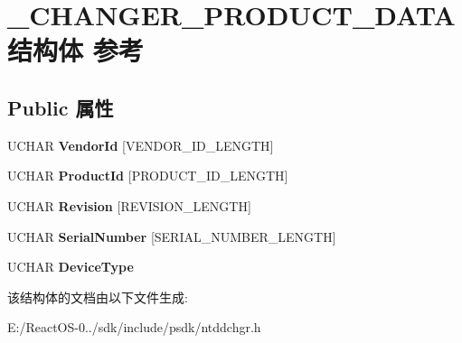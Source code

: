 \hypertarget{struct___c_h_a_n_g_e_r___p_r_o_d_u_c_t___d_a_t_a}{}\section{\+\_\+\+C\+H\+A\+N\+G\+E\+R\+\_\+\+P\+R\+O\+D\+U\+C\+T\+\_\+\+D\+A\+T\+A结构体 参考}
\label{struct___c_h_a_n_g_e_r___p_r_o_d_u_c_t___d_a_t_a}
\subsection*{Public 属性}
\begin{DoxyCompactItemize}
\item 
\mbox{\label{struct___c_h_a_n_g_e_r___p_r_o_d_u_c_t___d_a_t_a_a414f686fd51bea3dd3a80bcc1af3b186}} 
U\+C\+H\+AR {\bfseries Vendor\+Id} \mbox{[}V\+E\+N\+D\+O\+R\+\_\+\+I\+D\+\_\+\+L\+E\+N\+G\+TH\mbox{]}
\item 
\mbox{\label{struct___c_h_a_n_g_e_r___p_r_o_d_u_c_t___d_a_t_a_afbf53d5f272f01fa146acb83e92cc750}} 
U\+C\+H\+AR {\bfseries Product\+Id} \mbox{[}P\+R\+O\+D\+U\+C\+T\+\_\+\+I\+D\+\_\+\+L\+E\+N\+G\+TH\mbox{]}
\item 
\mbox{\label{struct___c_h_a_n_g_e_r___p_r_o_d_u_c_t___d_a_t_a_a065cc3591121d1f18750412df77dfdf8}} 
U\+C\+H\+AR {\bfseries Revision} \mbox{[}R\+E\+V\+I\+S\+I\+O\+N\+\_\+\+L\+E\+N\+G\+TH\mbox{]}
\item 
\mbox{\label{struct___c_h_a_n_g_e_r___p_r_o_d_u_c_t___d_a_t_a_a13f4f1d710c0b3116e616caf2e7e349b}} 
U\+C\+H\+AR {\bfseries Serial\+Number} \mbox{[}S\+E\+R\+I\+A\+L\+\_\+\+N\+U\+M\+B\+E\+R\+\_\+\+L\+E\+N\+G\+TH\mbox{]}
\item 
\mbox{\label{struct___c_h_a_n_g_e_r___p_r_o_d_u_c_t___d_a_t_a_ab574290f5b42bb085319bad19b327a62}} 
U\+C\+H\+AR {\bfseries Device\+Type}
\end{DoxyCompactItemize}


该结构体的文档由以下文件生成\+:\begin{DoxyCompactItemize}
\item 
E\+:/\+React\+O\+S-\/0../sdk/include/psdk/ntddchgr.\+h\end{DoxyCompactItemize}
